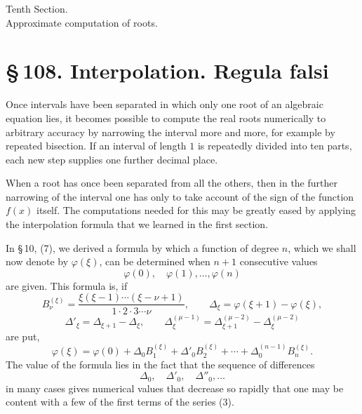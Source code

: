 \documentclass[11pt]{article}
\providecommand{\sect}[2]{\section*{\S\,#1. #2}}
\begin{document}
\newcommand{\weberfigtwentyfive}{
\begin{center}
\begin{tikzpicture}[scale=0.95,line cap=round]
\draw (-1.6,0)--(2.2,0);
\draw (-1.25,-1.1)--(-1.25,1.35);
\draw (1.55,-1.1)--(1.55,1.35);
\draw[smooth,domain=-1.25:1.55,variable=\t] plot ({\t},{-0.95+2.1*((\t+1.25)/2.8)^2});
\draw (-1.25,-0.95)--(1.55,1.12);
\draw (0.45,0)--(1.55,1.12);
\draw (1.12,0)--(1.55,1.12);
\node at (-1.35,-0.16){$\alpha$};
\node at (0.45,-0.16){$\alpha'$};
\node at (1.10,-0.16){$\beta'$};
\node at (1.68,-0.16){$\beta$};
\end{tikzpicture}\\[-0.2em]
{\small Fig. 25.}
\end{center}
}


\begin{center}
{\Large Tenth Section.}\\[0.6em]
{\large Approximate computation of roots.}
\end{center}

\sect{108}{Interpolation. Regula falsi}

Once intervals have been separated in which only one root of an algebraic equation lies, it becomes possible to compute the real roots numerically to arbitrary accuracy by narrowing the interval more and more, for example by repeated bisection. If an interval of length $1$ is repeatedly divided into ten parts, each new step supplies one further decimal place.

When a root has once been separated from all the others, then in the further narrowing of the interval one has only to take account of the sign of the function $f(x)$ itself. The computations needed for this may be greatly eased by applying the interpolation formula that we learned in the first section.

In \S\,10, (7), we derived a formula by which a function of degree $n$, which we shall now denote by $\varphi(\xi)$, can be determined when $n+1$ consecutive values
\[
        \varphi(0),\quad \varphi(1),\ldots,\varphi(n)
\]
are given. This formula is, if
\begin{equation}
        B_\nu^{(\xi)}=
        \frac{\xi(\xi-1)\cdots(\xi-\nu+1)}
             {1\cdot2\cdot3\cdots\nu},\qquad
        \Delta_\xi=\varphi(\xi+1)-\varphi(\xi),
\tag{1}
\end{equation}
\[
        \Delta'_\xi=\Delta_{\xi+1}-\Delta_\xi,\qquad
        \Delta_\xi^{(\mu-1)}
        =\Delta_{\xi+1}^{(\mu-2)}-\Delta_\xi^{(\mu-2)}
\tag{2}
\]
are put,
\begin{equation}
        \varphi(\xi)=\varphi(0)+
        \Delta_0B_1^{(\xi)}+\Delta'_0B_2^{(\xi)}
        +\cdots+\Delta_0^{(n-1)}B_n^{(\xi)}.
\tag{3}
\end{equation}
The value of the formula lies in the fact that the sequence of differences
\[
        \Delta_0,\quad \Delta'_0,\quad \Delta''_0,\ldots
\]
in many cases gives numerical values that decrease so rapidly that one may be content with a few of the first terms of the series (3).
\end{document}
